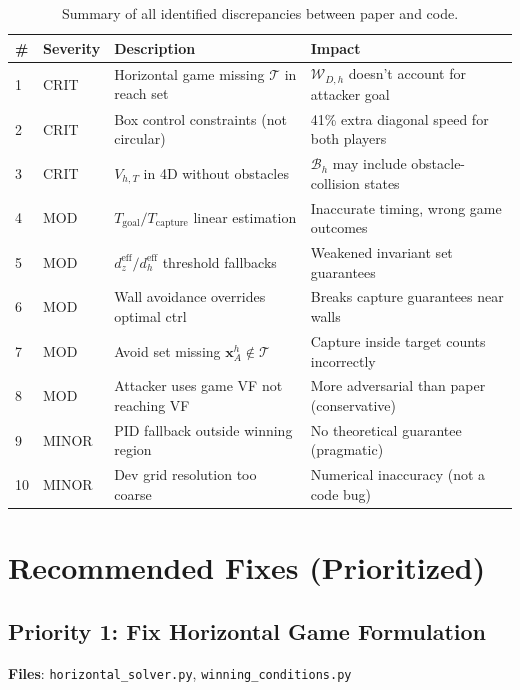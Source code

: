 \documentclass[11pt,a4paper]{article}
\begin{document}
\begin{table}[H]
\centering
\small
\begin{tabular}{@{}p{0.5cm}p{1.2cm}p{5.5cm}p{4.5cm}@{}}
\toprule
\textbf{\#} & \textbf{Severity} & \textbf{Description} & \textbf{Impact} \\
\midrule
1 & \textcolor{critred}{CRIT} & Horizontal game missing $\mathcal{T}$ in reach set & $\mathcal{W}_{D,h}$ doesn't account for attacker goal \\
2 & \textcolor{critred}{CRIT} & Box control constraints (not circular) & 41\% extra diagonal speed for both players \\
3 & \textcolor{critred}{CRIT} & $V_{h,T}$ in 4D without obstacles & $\mathcal{B}_h$ may include obstacle-collision states \\
4 & \textcolor{modoran}{MOD} & $T_{\mathrm{goal}}/T_{\mathrm{capture}}$ linear estimation & Inaccurate timing, wrong game outcomes \\
5 & \textcolor{modoran}{MOD} & $d_z^{\mathrm{eff}}/d_h^{\mathrm{eff}}$ threshold fallbacks & Weakened invariant set guarantees \\
6 & \textcolor{modoran}{MOD} & Wall avoidance overrides optimal ctrl & Breaks capture guarantees near walls \\
7 & \textcolor{modoran}{MOD} & Avoid set missing $\mathbf{x}^h_A \notin \mathcal{T}$ & Capture inside target counts incorrectly \\
8 & \textcolor{modoran}{MOD} & Attacker uses game VF not reaching VF & More adversarial than paper (conservative) \\
9 & \textcolor{minblue}{MINOR} & PID fallback outside winning region & No theoretical guarantee (pragmatic) \\
10 & \textcolor{minblue}{MINOR} & Dev grid resolution too coarse & Numerical inaccuracy (not a code bug) \\
\bottomrule
\end{tabular}
\caption{Summary of all identified discrepancies between paper and code.}
\label{tab:summary}
\end{table}

\section{Recommended Fixes (Prioritized)}

\subsection{Priority 1: Fix Horizontal Game Formulation}
\textbf{Files}: \texttt{horizontal\_solver.py}, \texttt{winning\_conditions.py}
\end{document}

